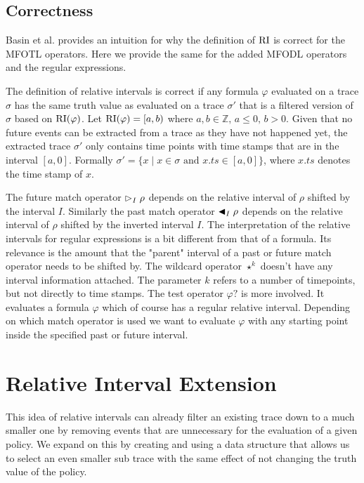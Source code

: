 \subsection{Correctness}
Basin et al. \cite{Basin2016} provides an intuition for why the definition of $\operatorname{RI}$ is correct for the MFOTL operators.
Here we provide the same for the added MFODL \cite{Basin2020} operators and the regular expressions.

The definition of relative intervals is correct if any formula $\varphi$ evaluated on a trace $\sigma$ has the same truth value as evaluated on a trace $\sigma'$ that is a filtered version of $\sigma$ based on $\operatorname{RI}(\varphi)$.
Let $\operatorname{RI}(\varphi) = [a,b)$ where $a,b \in \mathbb{Z}, \, a \leq 0, \, b > 0$.
Given that no future events can be extracted from a trace as they have not happened yet, the extracted trace $\sigma'$ only contains time points with time stamps that are in the interval $[a,0]$.
Formally $\sigma' = \{x \mid x \in \sigma \text{ and } x.ts \in [a,0]\}$, where $x.ts$ denotes the time stamp of $x$.

The future match operator $\vartriangleright_I \rho$ depends on the relative interval of $\rho$ shifted by the interval $I$.
Similarly the past match operator $\blacktriangleleft_I \rho$ depends on the relative interval of $\rho$ shifted by the inverted interval $I$.
The interpretation of the relative intervals for regular expressions is a bit different from that of a formula.
Its relevance is the amount that the "parent" interval of a past or future match operator needs to be shifted by.
The wildcard operator $\star^k$ doesn't have any interval information attached.
The parameter $k$ refers to a number of timepoints, but not directly to time stamps.
The test operator $\varphi ?$ is more involved.
It evaluates a formula $\varphi$ which of course has a regular relative interval.
Depending on which match operator is used we want to evaluate $\varphi$ with any starting point inside the specified past or future interval.




\section{Relative Interval Extension}

This idea of relative intervals can already filter an existing trace down to a much smaller one by removing events that are unnecessary for the evaluation of a given policy.
We expand on this by creating and using a data structure that allows us to select an even smaller sub trace with the same effect of not changing the truth value of the policy.

